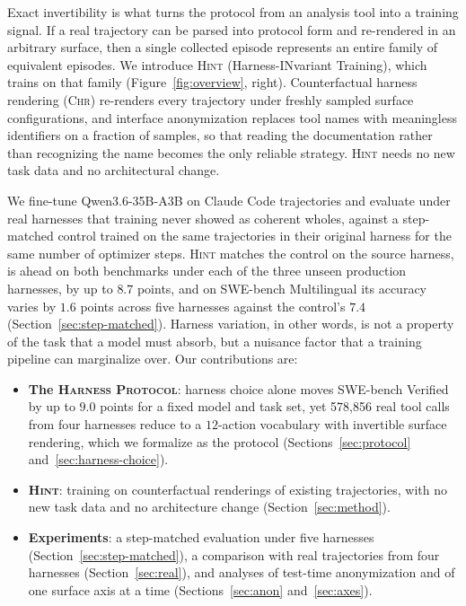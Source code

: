 \documentclass{article} %
\newcommand{\HP}{\textsc{Harness Protocol}}
\newcommand{\method}{\textsc{Hint}}
\newcommand{\chr}{\textsc{Chr}}
\newcommand{\basemodel}{Qwen3.6-35B-A3B}
\newcommand{\swev}{SWE-bench Verified}
\newcommand{\swem}{SWE-bench Multilingual}
\newcommand{\claudecode}{Claude Code}
\newcommand{\control}{step-matched control}
\newcommand{\numactions}{578{,}856}       %
\begin{document}
Exact invertibility is what turns the protocol from an analysis tool into a
training signal. If a real trajectory can be parsed into protocol form and
re-rendered in an arbitrary surface, then a single collected episode represents an entire family of equivalent
episodes. We introduce \method{} (Harness-INvariant Training), which trains on
that family
(Figure~\ref{fig:overview}, right). Counterfactual harness rendering (\chr{})
re-renders every trajectory under freshly sampled surface configurations, and
interface anonymization replaces tool names with meaningless identifiers on a
fraction of samples, so that reading the documentation rather than recognizing
the name becomes the only reliable strategy. \method{} needs no new task data
and no architectural change.

We fine-tune \basemodel{} on \claudecode{} trajectories and evaluate under real
harnesses that training never showed as coherent wholes, against a \control{}
trained on the same trajectories in their original harness for the same number
of optimizer steps. \method{} matches the control on the source harness, is
ahead on both benchmarks under each of the three unseen production harnesses,
by up to $8.7$ points, and on \swem{} its accuracy varies by $1.6$ points
across five harnesses against the control's $7.4$
(Section~\ref{sec:step-matched}). Harness variation, in other words, is not a
property of the task that a model must absorb, but a nuisance factor that a
training pipeline can marginalize over. Our contributions are:
\begin{itemize}
\item \textbf{The \HP{}}: harness choice alone moves \swev{} by up to
  $9.0$ points for a fixed model and task set, yet \numactions{} real tool
  calls from four harnesses reduce to a $12$-action vocabulary with
  invertible surface rendering, which we formalize as the protocol
  (Sections~\ref{sec:protocol} and~\ref{sec:harness-choice}).
\item \textbf{\method{}}: training on counterfactual renderings of existing
  trajectories, with no new task data and no architecture change
  (Section~\ref{sec:method}).
\item \textbf{Experiments}: a step-matched evaluation under five harnesses
  (Section~\ref{sec:step-matched}), a comparison with real trajectories from
  four harnesses (Section~\ref{sec:real}), and analyses of test-time
  anonymization and of one surface axis at a time (Sections~\ref{sec:anon}
  and~\ref{sec:axes}).
\end{itemize}
\end{document}

